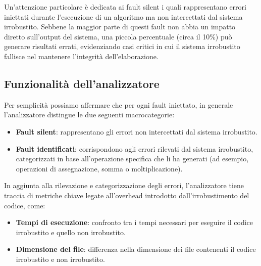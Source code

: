 Un'attenzione particolare è dedicata ai fault silent i quali rappresentano errori iniettati durante l'esecuzione di un algoritmo ma non intercettati dal sistema irrobustito. Sebbene la maggior parte di questi fault non abbia un impatto diretto sull'output del sistema, una piccola percentuale (circa il 10\%) può generare risultati errati, evidenziando casi critici in cui il sistema irrobustito fallisce nel mantenere l'integrità dell'elaborazione.

\subsection{Funzionalità dell'analizzatore}
Per semplicità possiamo affermare che per ogni fault iniettato, in generale l'analizzatore distingue le due seguenti macrocategorie:
\begin{itemize}
    \item \textbf{Fault silent}: rappresentano gli errori non intercettati dal sistema irrobustito.
    \item \textbf{Fault identificati}: corrispondono agli errori rilevati dal sistema irrobustito, categorizzati in base all'operazione specifica che li ha generati (ad esempio, operazioni di assegnazione, somma o moltiplicazione).
\end{itemize}

In aggiunta alla rilevazione e categorizzazione degli errori, l'analizzatore tiene traccia di metriche chiave legate all'overhead introdotto dall'irrobustimento del codice, come:
\begin{itemize}

    \item \textbf{Tempi di esecuzione}: confronto tra i tempi necessari per eseguire il codice irrobustito e quello non irrobustito.
    \item \textbf{Dimensione del file}: differenza nella dimensione dei file contenenti il codice irrobustito e non irrobustito.
    
\end{itemize}

